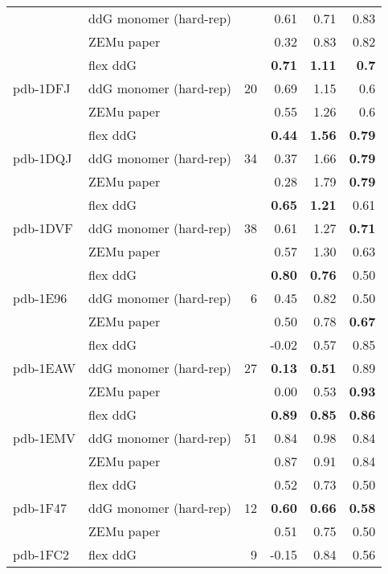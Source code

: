 \begin{longtable}{llrrrr}
 & ddG monomer (hard-rep) & & 0.61 & 0.71 & 0.83  \\
 & ZEMu paper & & 0.32 & 0.83 & 0.82  \\
\hline
 \multirow{ 3}{*}{pdb-1DFJ} & flex ddG & \multirow{ 3}{*}{20} & \textbf{0.71} & \textbf{1.11} & \textbf{0.7}  \\
 & ddG monomer (hard-rep) & & 0.69 & 1.15 & 0.6  \\
 & ZEMu paper & & 0.55 & 1.26 & 0.6  \\
\hline
 \multirow{ 3}{*}{pdb-1DQJ} & flex ddG & \multirow{ 3}{*}{34} & \textbf{0.44} & \textbf{1.56} & \textbf{0.79}  \\
 & ddG monomer (hard-rep) & & 0.37 & 1.66 & \textbf{0.79}  \\
 & ZEMu paper & & 0.28 & 1.79 & \textbf{0.79}  \\
\hline
 \multirow{ 3}{*}{pdb-1DVF} & flex ddG & \multirow{ 3}{*}{38} & \textbf{0.65} & \textbf{1.21} & 0.61  \\
 & ddG monomer (hard-rep) & & 0.61 & 1.27 & \textbf{0.71}  \\
 & ZEMu paper & & 0.57 & 1.30 & 0.63  \\
\hline
 \multirow{ 3}{*}{pdb-1E96} & flex ddG & \multirow{ 3}{*}{6} & \textbf{0.80} & \textbf{0.76} & 0.50  \\
 & ddG monomer (hard-rep) & & 0.45 & 0.82 & 0.50  \\
 & ZEMu paper & & 0.50 & 0.78 & \textbf{0.67}  \\
\hline
 \multirow{ 3}{*}{pdb-1EAW} & flex ddG & \multirow{ 3}{*}{27} & -0.02 & 0.57 & 0.85  \\
 & ddG monomer (hard-rep) & & \textbf{0.13} & \textbf{0.51} & 0.89  \\
 & ZEMu paper & & 0.00 & 0.53 & \textbf{0.93}  \\
\hline
 \multirow{ 3}{*}{pdb-1EMV} & flex ddG & \multirow{ 3}{*}{51} & \textbf{0.89} & \textbf{0.85} & \textbf{0.86}  \\
 & ddG monomer (hard-rep) & & 0.84 & 0.98 & 0.84  \\
 & ZEMu paper & & 0.87 & 0.91 & 0.84  \\
\hline
 \multirow{ 3}{*}{pdb-1F47} & flex ddG & \multirow{ 3}{*}{12} & 0.52 & 0.73 & 0.50  \\
 & ddG monomer (hard-rep) & & \textbf{0.60} & \textbf{0.66} & \textbf{0.58}  \\
 & ZEMu paper & & 0.51 & 0.75 & 0.50  \\
\hline
 \multirow{ 3}{*}{pdb-1FC2} & flex ddG & \multirow{ 3}{*}{9} & -0.15 & 0.84 & 0.56  \\

\end{longtable}
